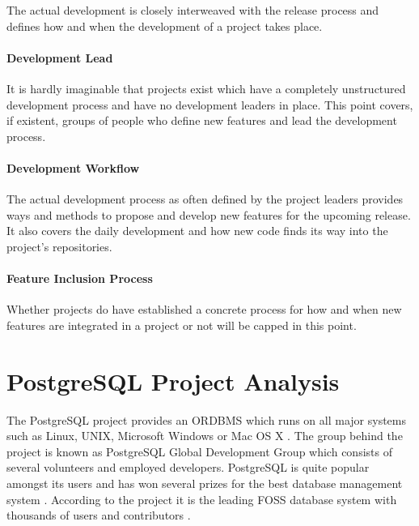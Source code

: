 The actual development is closely interweaved with the release process and
defines how and when the development of a project takes place.

\paragraph{Development Lead}

It is hardly imaginable that projects exist which have a completely
unstructured development process and have no development leaders in place. This
point covers, if existent, groups of people who define new features and lead
the development process.

\paragraph{Development Workflow}

The actual development process as often defined by the project leaders provides
ways and methods to propose and develop new features for the upcoming release.
It also covers the daily development and how new code finds its way into the
project's repositories.

\paragraph{Feature Inclusion Process}

Whether projects do have established a concrete process for how and when new
features are integrated in a project or not will be capped in this point.


\cleardoublepage

\section{PostgreSQL Project Analysis} %


The PostgreSQL project provides an \ac{ORDBMS} which runs on all major systems
such as Linux, UNIX, Microsoft Windows or Mac OS X
\cite{PostgreSQLAbout,PostgreSQLFAQ}. The group behind the project is known as
PostgreSQL Global Development Group which consists of several volunteers and
employed developers. PostgreSQL is quite popular amongst its users and has won
several prizes for the best database management system \cite{PostgreSQLAwards}.
According to the project it is the leading \ac{FOSS} database system with
thousands of users and contributors \cite{PostgreSQLPressKit}.

